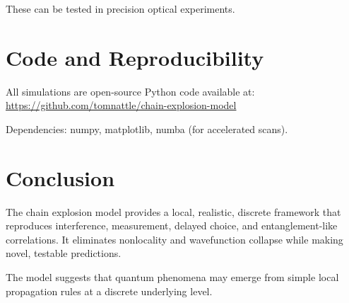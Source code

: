 \documentclass{article}
\begin{document}
These can be tested in precision optical experiments.

\section{Code and Reproducibility}
All simulations are open-source Python code available at:
\\
\href{https://github.com/tomnattle/chain-explosion-model}{https://github.com/tomnattle/chain-explosion-model}

Dependencies: numpy, matplotlib, numba (for accelerated scans).

\section{Conclusion}
The chain explosion model provides a local, realistic, discrete framework
that reproduces interference, measurement, delayed choice, and entanglement-like correlations.
It eliminates nonlocality and wavefunction collapse while making novel, testable predictions.

The model suggests that quantum phenomena may emerge from
simple local propagation rules at a discrete underlying level.
\end{document}
